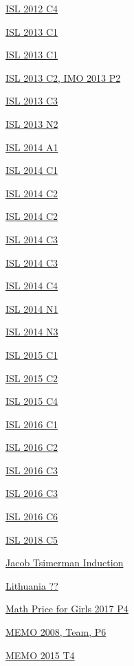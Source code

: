\hyperref  [problem:ISL 2012 C4]{ISL 2012 C4}

\hyperref  [problem:ISL 2013 C1]{ISL 2013 C1}

\hyperref  [problem:ISL 2013 C1]{ISL 2013 C1}

\hyperref  [problem:ISL 2013 C2, IMO 2013 P2]{ISL 2013 C2, IMO 2013 P2}

\hyperref  [problem:ISL 2013 C3]{ISL 2013 C3}

\hyperref  [problem:ISL 2013 N2]{ISL 2013 N2}

\hyperref  [problem:ISL 2014 A1]{ISL 2014 A1}

\hyperref  [problem:ISL 2014 C1]{ISL 2014 C1}

\hyperref  [problem:ISL 2014 C2]{ISL 2014 C2}

\hyperref  [problem:ISL 2014 C2]{ISL 2014 C2}

\hyperref  [problem:ISL 2014 C3]{ISL 2014 C3}

\hyperref  [problem:ISL 2014 C3]{ISL 2014 C3}

\hyperref  [problem:ISL 2014 C4]{ISL 2014 C4}

\hyperref  [problem:ISL 2014 N1]{ISL 2014 N1}

\hyperref  [problem:ISL 2014 N3]{ISL 2014 N3}

\hyperref  [problem:ISL 2015 C1]{ISL 2015 C1}

\hyperref  [problem:ISL 2015 C2]{ISL 2015 C2}

\hyperref  [problem:ISL 2015 C4]{ISL 2015 C4}

\hyperref  [problem:ISL 2016 C1]{ISL 2016 C1}

\hyperref  [problem:ISL 2016 C2]{ISL 2016 C2}

\hyperref  [problem:ISL 2016 C3]{ISL 2016 C3}

\hyperref  [problem:ISL 2016 C3]{ISL 2016 C3}

\hyperref  [problem:ISL 2016 C6]{ISL 2016 C6}

\hyperref  [problem:ISL 2018 C5]{ISL 2018 C5}

\hyperref  [problem:Jacob Tsimerman Induction]{Jacob Tsimerman Induction}

\hyperref  [problem:Lithuania ??]{Lithuania ??}

\hyperref  [problem:Math Price for Girls 2017 P4]{Math Price for Girls 2017 P4}

\hyperref  [problem:MEMO 2008, Team, P6]{MEMO 2008, Team, P6}

\hyperref  [problem:MEMO 2015 T4]{MEMO 2015 T4}

